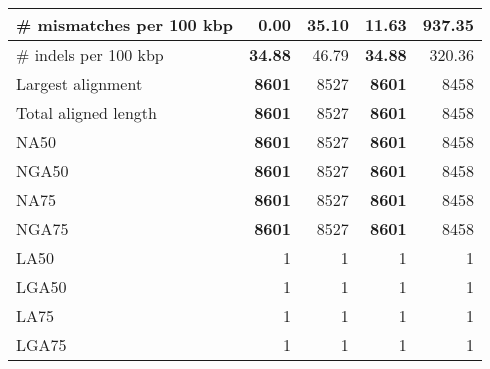 \documentclass[12pt,a4paper]{article}
\begin{document}
\begin{table}[ht]
\begin{center}
\begin{tabular}{|l*{4}{|r}|}
\# mismatches per 100 kbp & {\bf 0.00} & 35.10 & 11.63 & 937.35 \\ \hline
\# indels per 100 kbp & {\bf 34.88} & 46.79 & {\bf 34.88} & 320.36 \\ \hline
Largest alignment & {\bf 8601} & 8527 & {\bf 8601} & 8458 \\ \hline
Total aligned length & {\bf 8601} & 8527 & {\bf 8601} & 8458 \\ \hline
NA50 & {\bf 8601} & 8527 & {\bf 8601} & 8458 \\ \hline
NGA50 & {\bf 8601} & 8527 & {\bf 8601} & 8458 \\ \hline
NA75 & {\bf 8601} & 8527 & {\bf 8601} & 8458 \\ \hline
NGA75 & {\bf 8601} & 8527 & {\bf 8601} & 8458 \\ \hline
LA50 & 1 & 1 & 1 & 1 \\ \hline
LGA50 & 1 & 1 & 1 & 1 \\ \hline
LA75 & 1 & 1 & 1 & 1 \\ \hline
LGA75 & 1 & 1 & 1 & 1 \\ \hline
\end{tabular}
\end{center}
\end{table}
\end{document}
